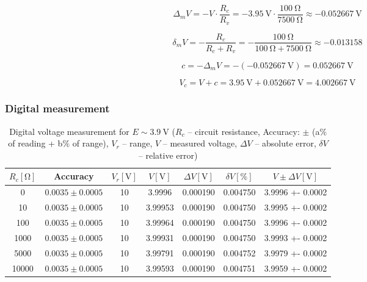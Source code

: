 \begin{equation}
	\Delta_m V = -V\cdot\frac{R_c}{R_v} = -\SI{3.95}{\volt}\cdot\frac{\SI{100}{\ohm}}{\SI{7500}{\ohm}} \approx -\SI{0.052667}{\volt}
	\label{eq:analog_Delta_m}
\end{equation}

\begin{equation}
	\delta_m V = -\frac{R_c}{R_c + R_v} = -\frac{\SI{100}{\ohm}}{\SI{100}{\ohm} + \SI{7500}{\ohm}} \approx -0.013158
	\label{eq:analog_delta_m}
\end{equation}

\begin{equation}
	c = -\Delta_m V = -(-\SI{0.052667}{\volt}) = \SI{0.052667}{\volt}
	\label{eq:analog_c}
\end{equation}

\begin{equation}
	V_c = V + c = \SI{3.95}{\volt} + \SI{0.052667}{\volt} = \SI{4.002667}{\volt}
	\label{eq:analog_V_c}
\end{equation}


\subsubsection*{Digital measurement}

\begin{table}[H]
	\centering
	\begin{tabular}{ c | c |  c | c | c | c | c}
		$R_c [\unit{\ohm}]$  & Accuracy & $V_r [\unit{\volt}]$ & $V [\unit{\volt}]$ & $\Delta V [\unit{\volt}]$ & $\delta V [\unit{\percent}]$ & $V \pm \Delta V [\unit{\volt}]$ \\
		\hline
		0  & $0.0035 \pm 0.0005$ & 10 & 3.9996 & 0.000190 & 0.004750 & 3.9996 +- 0.0002\\
		\hline
		10  & $0.0035 \pm 0.0005$  & 10 & 3.99953 & 0.000190 & 0.004750 & 3.9995 +- 0.0002\\
		\hline
		100  & $0.0035 \pm 0.0005$  & 10 & 3.99964 & 0.000190 & 0.004750 & 3.9996 +- 0.0002\\
		\hline
		1000 &$0.0035 \pm 0.0005$  & 10 & 3.99931 & 0.000190 & 0.004750 & 3.9993 +- 0.0002\\
		\hline
		5000  & $0.0035 \pm 0.0005$  & 10 & 3.99791 & 0.000190 & 0.004752 & 3.9979 +- 0.0002\\
		\hline
		10000 & $0.0035 \pm 0.0005$  & 10 & 3.99593 & 0.000190 & 0.004751 & 3.9959 +- 0.0002\\
	\end{tabular}
	\caption{Digital voltage measurement for $E \sim \SI{3.9}{\volt}$ ($R_c$ -- circuit resistance, Accuracy: $\pm$ (a$\unit{\percent}$ of reading + b$\unit{\percent}$ of range), $V_r$ -- range, $V$ -- measured voltage, $\Delta V$ -- absolute error, $\delta V$ -- relative error)}
	\label{tab:digital_voltage_1}
\end{table}

